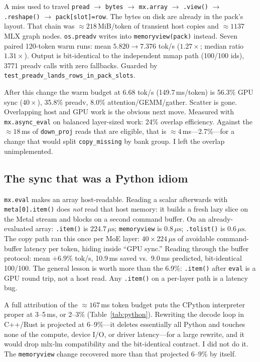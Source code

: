 A miss used to travel \texttt{pread} $\to$ \texttt{bytes} $\to$ \texttt{mx.array} $\to$ \texttt{.view()} $\to$ \texttt{.reshape()} $\to$ \texttt{pack[slot]=row}. The bytes on disk are already in the pack's layout. That chain was $\approx 218$\,MiB/token of transient host copies and $\approx 1137$ MLX graph nodes. \texttt{os.preadv} writes into \texttt{memoryview(pack)} instead. Seven paired 120-token warm runs: mean $5.820\to 7.376$ tok/s ($1.27\times$; median ratio $1.31\times$). Output is bit-identical to the independent mmap path (100/100 ids), 3771 preadv calls with zero fallbacks. Guarded by \texttt{test\_preadv\_lands\_rows\_in\_pack\_slots}.

After this change the warm budget at 6.68 tok/s (149.7\,ms/token) is 56.3\% GPU sync ($40\times$), 35.8\% preadv, 8.0\% attention/GEMM/gather. Scatter is gone. Overlapping host and GPU work is the obvious next move. Measured with \texttt{mx.async\_eval} on balanced layer-sized work: 24\% overlap efficiency. Against the $\approx 18$\,ms of \texttt{down\_proj} reads that are eligible, that is $\approx 4$\,ms---2.7\%---for a change that would split \texttt{copy\_missing} by bank group. I left the overlap unimplemented.

\subsection{The sync that was a Python idiom}

\texttt{mx.eval} makes an array host-readable. Reading a scalar afterwards with \texttt{meta[0].item()} does \emph{not} read that host memory: it builds a fresh lazy slice on the Metal stream and blocks on a second command buffer. On an already-evaluated array: \texttt{.item()} is $224.7\,\mu\mathrm{s}$; \texttt{memoryview} is $0.8\,\mu\mathrm{s}$; \texttt{.tolist()} is $0.6\,\mu\mathrm{s}$. The copy path ran this once per MoE layer: $40\times 224\,\mu\mathrm{s}$ of avoidable command-buffer latency per token, hiding inside ``GPU sync.'' Reading through the buffer protocol: mean $+6.9\%$ tok/s, 10.9\,ms saved vs.\ 9.0\,ms predicted, bit-identical 100/100. The general lesson is worth more than the 6.9\%: \texttt{.item()} after \texttt{eval} is a GPU round trip, not a host read. Any \texttt{.item()} on a per-layer path is a latency bug.

A full attribution of the $\approx 167$\,ms token budget puts the CPython interpreter proper at 3--5\,ms, or 2--3\% (Table~\ref{tab:python}). Rewriting the decode loop in C++/Rust is projected at 6--9\%---it deletes essentially all Python and touches none of the compute, device I/O, or driver latency---for a large rewrite, and it would drop mlx-lm compatibility and the bit-identical contract. I did not do it. The \texttt{memoryview} change recovered more than that projected 6--9\% by itself.

